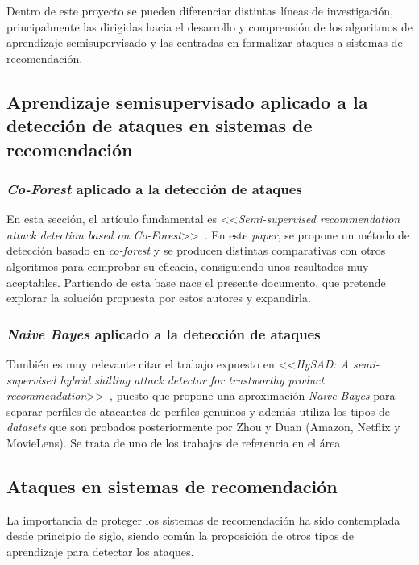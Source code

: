 
Dentro de este proyecto se pueden diferenciar distintas líneas de investigación, principalmente las dirigidas hacia el desarrollo y comprensión de los algoritmos de aprendizaje semisupervisado y las centradas en formalizar ataques a sistemas de recomendación.

\subsection{Aprendizaje semisupervisado aplicado a la detección de ataques en sistemas de recomendación}

\subsubsection{\textit{Co-Forest} aplicado a la detección de ataques~\cite{zhou2021SemisupervisedRecommendationAttack}}
En esta sección, el artículo fundamental es <<\textit{Semi-supervised recommendation attack detection based on Co-Forest}>>~\cite{zhou2021SemisupervisedRecommendationAttack}. En este \textit{paper}, se propone un método de detección basado en \textit{co-forest} y se producen distintas comparativas con otros algoritmos para comprobar su eficacia, consiguiendo unos resultados muy aceptables. Partiendo de esta base nace el presente documento, que pretende explorar la solución propuesta por estos autores y expandirla.

\subsubsection{\textit{Naive Bayes} aplicado a la detección de ataques~\cite{zhiang2012HySADNayveBayes}}
También es muy relevante citar el trabajo expuesto en <<\textit{HySAD: A semi-supervised hybrid shilling attack detector for trustworthy product recommendation}>>~\cite{zhiang2012HySADNayveBayes}, puesto que propone una aproximación \textit{Naive Bayes} para separar perfiles de atacantes de perfiles genuinos y además utiliza los tipos de \textit{datasets} que son probados posteriormente por Zhou y Duan (Amazon, Netflix y MovieLens). Se trata de uno de los trabajos de referencia en el área.

\subsection{Ataques en sistemas de recomendación}

La importancia de proteger los sistemas de recomendación ha sido contemplada desde principio de siglo, siendo común la proposición de otros tipos de aprendizaje para detectar los ataques.

